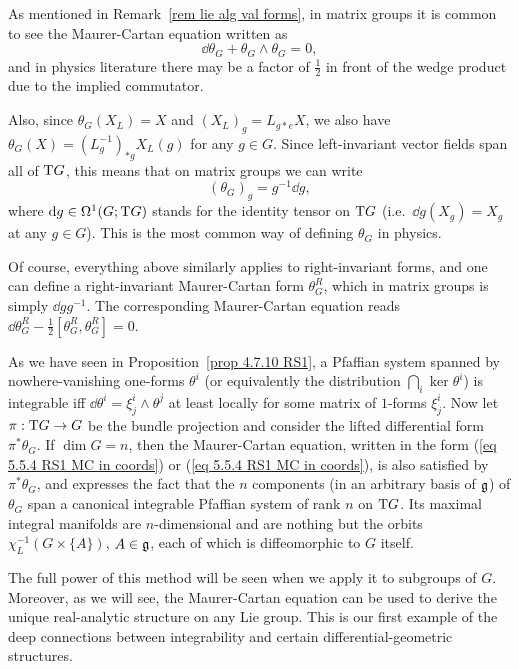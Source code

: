 
\begin{rem}
    As mentioned in Remark~\ref{rem lie alg val forms}, in matrix groups it is common to see the Maurer-Cartan equation written as 
    \[\dd\theta_G +\theta_G\wedge\theta_G=0,\]
    and in physics literature there may be a factor of $\frac12$ in front of the wedge product due to the implied commutator.

    Also, since $\theta_G(X_L)=X$ and $(X_L)_g=L_{g\ast e}X$, we also have $\theta_G(X)=(L_{g}^{-1})_{\ast g}X_L(g)$ for any $g\in G$. Since left-invariant vector fields span all of $\mathrm{T} G$, this means that on matrix groups we can write 
    \[(\theta_G)_g=g^{-1}\dd g,\]
    where ${\mathrm{d}} g\in \Omega^1(G;\mathrm{T} G)$ stands for the identity tensor on $\mathrm{T} G$ (i.e.~$\dd g(X_g)=X_g$ at any $g\in G$). This is the most common way of defining $\theta_G$ in physics.
\end{rem}

\begin{rem}
    Of course, everything above similarly applies to right-invariant forms, and one can define a right-invariant Maurer-Cartan form $\theta_G^R$, which in matrix groups is simply $\dd g g^{-1}$. The corresponding Maurer-Cartan equation reads $\dd\theta_G^R-\frac12[\theta_G^R,\theta_G^R]=0$.
\end{rem}

\begin{rem}
    As we have seen  in Proposition~\ref{prop 4.7.10 RS1}, a Pfaffian system spanned by nowhere-vanishing one-forms $\theta^i$ (or equivalently the distribution $\bigcap_i\ker\theta^i$) is integrable iff $\dd \theta^i=\xi^i_j\wedge\theta^j$ at least locally for some matrix of $1$-forms $\xi^i_j$. Now let $\pi:\mathrm{T} G\to G$ be the bundle projection and consider the lifted differential form $\pi^\ast\theta_G$. If $\dim G=n$, then the Maurer-Cartan equation, written in the form (\ref{eq 5.5.4 RS1 MC in coords}) or (\ref{eq 5.5.4 RS1 MC in coords}), is also satisfied by $\pi^\ast\theta_G$, and expresses the fact that the $n$ components (in an arbitrary basis of $\mathfrak{g}$) of $\theta_G$ span a canonical integrable Pfaffian system of rank $n$ on $\mathrm{T} G$. Its maximal integral manifolds are $n$-dimensional and are nothing but the orbits $\chi_L^{-1}(G\times \{A\})$, $A\in\mathfrak{g}$, each of which is diffeomorphic to $G$ itself. 
    
    The full power of this method will be seen when we apply it to subgroups of $G$. Moreover, as we will see, the Maurer-Cartan equation can be used to derive the unique real-analytic structure on any Lie group. This is our first example of the deep connections between integrability and certain differential-geometric structures.
\end{rem}


